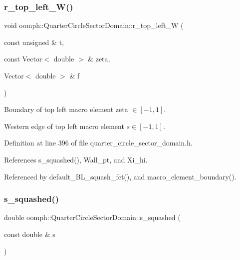 \mbox{\label{classoomph_1_1QuarterCircleSectorDomain_a84f4970adc3a93392ef1a57f19df96a1}} 
\subsubsection{\texorpdfstring{r\+\_\+top\+\_\+left\+\_\+\+W()}{r\_top\_left\_W()}}
{\footnotesize\ttfamily void oomph\+::\+Quarter\+Circle\+Sector\+Domain\+::r\+\_\+top\+\_\+left\+\_\+W (\begin{DoxyParamCaption}\item[{const unsigned \&}]{t,  }\item[{const Vector$<$ double $>$ \&}]{zeta,  }\item[{Vector$<$ double $>$ \&}]{f }\end{DoxyParamCaption})\hspace{0.3cm}{\ttfamily [private]}}



Boundary of top left macro element zeta $ \in [-1,1] $. 

Western edge of top left macro element $s \in [-1,1] $. 

Definition at line 396 of file quarter\+\_\+circle\+\_\+sector\+\_\+domain.\+h.



References s\+\_\+squashed(), Wall\+\_\+pt, and Xi\+\_\+hi.



Referenced by default\+\_\+\+B\+L\+\_\+squash\+\_\+fct(), and macro\+\_\+element\+\_\+boundary().

\mbox{\label{classoomph_1_1QuarterCircleSectorDomain_a5b66f846233b3cf976ed63d9bf54f0c7}} 
\subsubsection{\texorpdfstring{s\+\_\+squashed()}{s\_squashed()}}
{\footnotesize\ttfamily double oomph\+::\+Quarter\+Circle\+Sector\+Domain\+::s\+\_\+squashed (\begin{DoxyParamCaption}\item[{const double \&}]{s }\end{DoxyParamCaption})\hspace{0.3cm}{\ttfamily [inline]}}



